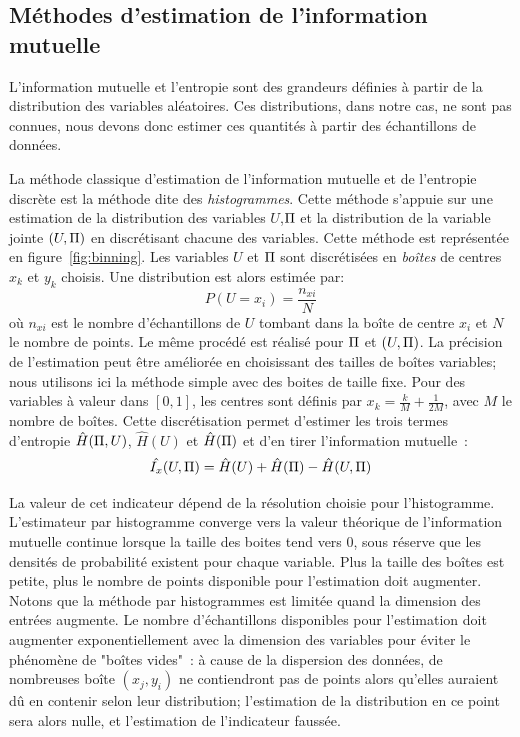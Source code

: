 \documentclass[../main]{subfiles}
\begin{document}
\subsection{Méthodes d'estimation de l'information mutuelle}

L'information mutuelle et l'entropie sont des grandeurs définies à partir de la distribution des variables aléatoires. Ces distributions, dans notre cas, ne sont pas connues, nous devons donc estimer ces quantités à partir des échantillons de données.

La méthode classique d'estimation de l'information mutuelle et de l'entropie discrète est la méthode dite des \emph{histogrammes}.
Cette méthode s'appuie sur une estimation de la distribution des variables $U$,$\Pi$ et la distribution de la variable jointe $(U,\Pi)$ en discrétisant chacune des variables.
Cette méthode est représentée en figure~\ref{fig:binning}. Les variables $U$ et $\Pi$ sont discrétisées en \emph{boîtes} de centres $x_k$ et $y_k$ choisis.
Une distribution est alors estimée par: 
$$P(U = x_i) = \frac{n_{xi}}{N} $$ où $n_{xi}$ est le nombre d'échantillons de $U$ tombant dans la boîte de centre $x_i$ et $N$ le nombre de points. Le même procédé est réalisé pour $\Pi$ et $(U,\Pi)$. La précision de l'estimation peut être améliorée en choisissant des tailles de boîtes variables; nous utilisons ici la méthode simple avec des boites de taille fixe.
Pour des variables à valeur dans $[0,1]$, les centres sont définis par $x_k = \frac{k}{M}+\frac{1}{2M}$, avec $M$ le nombre de boîtes.
Cette discrétisation permet d'estimer les trois termes d'entropie $\hat{H}(\Pi,U)$, $\hat{H}(U)$ et $\hat{H}(\Pi)$ et d'en tirer l'information mutuelle~:
\begin{equation}
    \hat{I_x}(U,\Pi) = \hat{H}(U) + \hat{H}(\Pi) - \hat{H}(U,\Pi)
   \end{equation}

La valeur de cet indicateur dépend de la résolution choisie pour l'histogramme. L'estimateur  par histogramme converge vers la valeur théorique de l'information mutuelle continue lorsque la taille des boites tend vers 0, sous réserve que les densités de probabilité existent pour chaque variable.
Plus la taille des boîtes est petite, plus le nombre de points disponible pour l'estimation doit augmenter.
Notons que la méthode par histogrammes est limitée quand la dimension des entrées augmente.
Le nombre d'échantillons disponibles pour l'estimation doit augmenter exponentiellement avec la dimension des variables pour éviter le phénomène de "boîtes vides"~: à cause de la dispersion des données, de nombreuses boîte $(x_j,y_i)$ ne contiendront pas de points alors qu'elles auraient dû en contenir selon leur distribution; l'estimation de la distribution en ce point sera alors nulle, et l'estimation de l'indicateur faussée.
\end{document}
